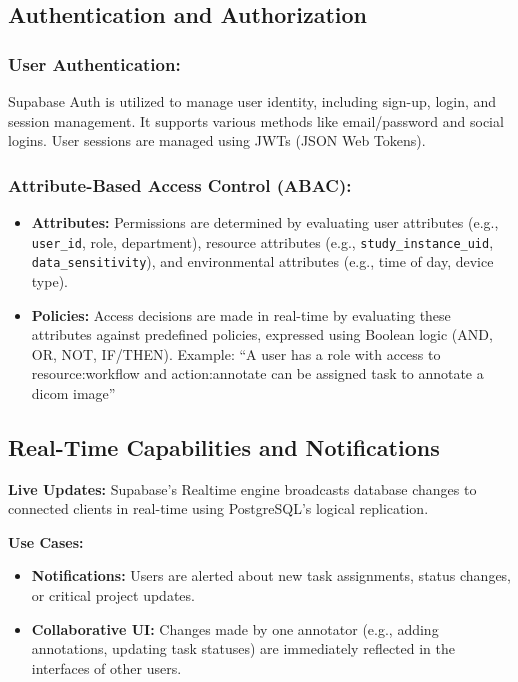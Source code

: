 \subsection{Authentication and Authorization}

\subsubsection*{User Authentication:} 
Supabase Auth is utilized to manage user identity, including sign-up, login, and session management. It supports various methods like email/password and social logins. User sessions are managed using JWTs (JSON Web Tokens).

\subsubsection*{Attribute-Based Access Control (ABAC):}
\begin{itemize}
    \item \textbf{Attributes:} Permissions are determined by evaluating user attributes (e.g., \texttt{user\_id}, role, department), resource attributes (e.g., \texttt{study\_instance\_uid}, \texttt{data\_sensitivity}), and environmental attributes (e.g., time of day, device type).
    \item \textbf{Policies:} Access decisions are made in real-time by evaluating these attributes against predefined policies, expressed using Boolean logic (AND, OR, NOT, IF/THEN). Example: ``A user has a role with access to resource:workflow and action:annotate can be assigned task to annotate a dicom image''
\end{itemize}

\subsection{Real-Time Capabilities and Notifications}

\textbf{Live Updates:} 
Supabase's Realtime engine broadcasts database changes to connected clients in real-time using PostgreSQL's logical replication.

\textbf{Use Cases:}
\begin{itemize}
    \item \textbf{Notifications:} Users are alerted about new task assignments, status changes, or critical project updates.
    \item \textbf{Collaborative UI:} Changes made by one annotator (e.g., adding annotations, updating task statuses) are immediately reflected in the interfaces of other users.
\end{itemize}

